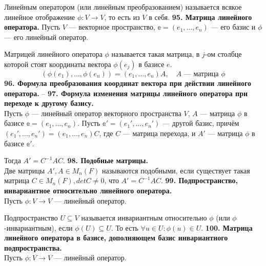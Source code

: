 \documentclass{article}
\begin{document}
Линейным оператором (или линейным преобразованием) называется всякое линейное отображение $\phi \colon V \rightarrow V$, то есть из $V$ в себя.
\newline
\newline
\textbf{95. Матрица линейного оператора.}
Пусть $V$ --- векторное пространство, $\mathbb{e} = (e_1, \ldots, e_n)$ --- его базис и $\phi$ --- его линейный оператор.

Матрицей линейного оператора $\phi$ называется такая матрица, в $j$-ом столбце которой стоят координаты вектора $\phi(e_j)$ в базисе $e$.
$$
\left(\phi(e_1), \ldots, \phi(e_n)\right) = \left(e_1, \ldots, e_n\right)A, \quad A \text{ --- матрица $\phi$}
$$
\textbf{96. Формула преобразования координат вектора при действии линейного оператора.}
--
\newline
\newline
\textbf{97. Формула изменения матрицы линейного оператора при переходе к другому базису.}\\
Пусть $\phi$ --- линейный оператор векторного пространства $V$, $A$ --- матрица $\phi$ в базисе $\mathbb{e} = (e_1, \ldots, e_n)$. Пусть $\mathbb{e}' = (e_1', \ldots, e_n')$ --- другой базис, причём $(e_1', \ldots, e_n') = (e_1, \ldots, e_n)C$, где $C$ --- матрица перехода, и $A'$ --- матрица $\phi$ в базисе $\mathbb{e}'$.

Тогда $A' = C^{-1}AC$.
\newline
\newline
\textbf{98. Подобные матрицы.}\\
Две матрицы $A', A \in M_n(F)$ называются подобными, если существует такая матрица $C \in M_n(F), det C \neq 0$, что $A' = C^{-1}AC$.
\newline
\newline
\textbf{99. Подпространство, инвариантное относительно линейного оператора.}\\
Пусть $\phi\colon V \rightarrow V$ --- линейный оператор.

Подпространство $U \subseteq V$ называется инвариантным относительно $\phi$ (или $\phi$-инвариантным), если $\phi(U)\subseteq U$. То есть $\forall u\in U \colon \phi(u)\in U$. 
\newline
\newline
\textbf{100. Матрица линейного оператора в базисе, дополняющем базис инвариантного подпространства.}\\
Пусть $\phi\colon V \rightarrow V$ --- линейный оператор.
\end{document}
